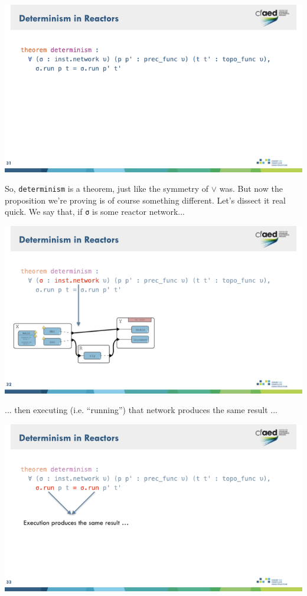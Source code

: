 \documentclass{article}
\begin{document}
\begin{center}
    \includegraphics[width=\columnwidth]{Slides/Slide 31.jpeg}
\end{center}

So, \verb|determinism| is a theorem, just like the symmetry of $\vee$ was.
But now the proposition we're proving is of course something different.
Let's dissect it real quick.
We say that, if \lstinline|σ| is some reactor network...

\begin{center}
    \includegraphics[width=\columnwidth]{Slides/Slide 32.jpeg}
\end{center}

... then executing (i.e. ``running'') that network produces the same result ...

\begin{center}
    \includegraphics[width=\columnwidth]{Slides/Slide 33.jpeg}
\end{center}
\end{document}
